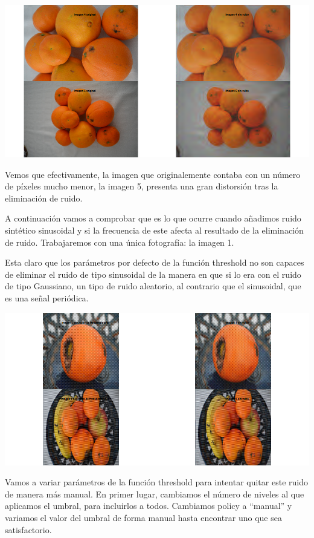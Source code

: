 \documentclass[
]{article}
\begin{document}
\begin{center}\includegraphics[width=1\linewidth]{imwd/image4_5_original_size} \end{center}

Vemos que efectivamente, la imagen que originalemente contaba con un
número de píxeles mucho menor, la imagen 5, presenta una gran distorsión
tras la eliminación de ruido.

A continuación vamos a comprobar que es lo que ocurre cuando añadimos
ruido sintético sinusoidal y si la frecuencia de este afecta al
resultado de la eliminación de ruido. Trabajaremos con una única
fotografía: la imagen 1.

Esta claro que los parámetros por defecto de la función threshold no son
capaces de eliminar el ruido de tipo sinusoidal de la manera en que si
lo era con el ruido de tipo Gaussiano, un tipo de ruido aleatorio, al
contrario que el sinusoidal, que es una señal periódica.

\begin{center}\includegraphics[width=1\linewidth]{imwd/image1_sinusoidal} \end{center}

Vamos a variar parámetros de la función threshold para intentar quitar
este ruido de manera más manual. En primer lugar, cambiamos el número de
niveles al que aplicamos el umbral, para incluirlos a todos. Cambiamos
policy a ``manual'' y variamos el valor del umbral de forma manual hasta
encontrar uno que sea satisfactorio.
\end{document}
